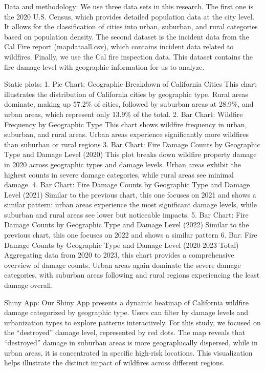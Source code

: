 \documentclass[
  letterpaper,
  DIV=11,
  numbers=noendperiod]{scrartcl}
\begin{document}
Data and methodology: We use three data sets in this research. The first
one is the 2020 U.S. Census, which provides detailed population data at
the city level. It allows for the classification of cities into urban,
suburban, and rural categories based on population density. The second
dataset is the incident data from the Cal Fire report (mapdataall.csv),
which contains incident data related to wildfires. Finally, we use the
Cal fire inspection data. This dataset contains the fire damage level
with geographic information for us to analyze.

Static plots: 1. Pie Chart: Geographic Breakdown of California Cities
This chart illustrates the distribution of California cities by
geographic type. Rural areas dominate, making up 57.2\% of cities,
followed by suburban areas at 28.9\%, and urban areas, which represent
only 13.9\% of the total. 2. Bar Chart: Wildfire Frequency by Geographic
Type This chart shows wildfire frequency in urban, suburban, and rural
areas. Urban areas experience significantly more wildfires than suburban
or rural regions 3. Bar Chart: Fire Damage Counts by Geographic Type and
Damage Level (2020) This plot breaks down wildfire property damage in
2020 across geographic types and damage levels. Urban areas exhibit the
highest counts in severe damage categories, while rural areas see
minimal damage. 4. Bar Chart: Fire Damage Counts by Geographic Type and
Damage Level (2021) Similar to the previous chart, this one focuses on
2021 and shows a similar pattern: urban areas experience the most
significant damage levels, while suburban and rural areas see lower but
noticeable impacts. 5. Bar Chart: Fire Damage Counts by Geographic Type
and Damage Level (2022) Similar to the previous chart, this one focuses
on 2022 and shows a similar pattern 6. Bar: Fire Damage Counts by
Geographic Type and Damage Level (2020-2023 Total) Aggregating data from
2020 to 2023, this chart provides a comprehensive overview of damage
counts. Urban areas again dominate the severe damage categories, with
suburban areas following and rural regions experiencing the least damage
overall.

Shiny App: Our Shiny App presents a dynamic heatmap of California
wildfire damage categorized by geographic type. Users can filter by
damage levels and urbanization types to explore patterns interactively.
For this study, we focused on the ``destroyed'' damage level,
represented by red dots. The map reveals that ``destroyed'' damage in
suburban areas is more geographically dispersed, while in urban areas,
it is concentrated in specific high-risk locations. This visualization
helps illustrate the distinct impact of wildfires across different
regions.
\end{document}
